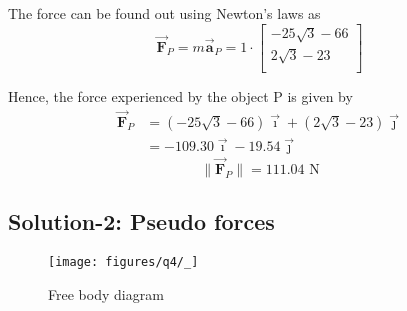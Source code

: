 The force can be found out using Newton's laws as
\begin{equation*}
    \vec{\mathbf{F}}_P
    =
    m \vec{\mathbf{a}}_P = 1 \cdot
    \begin{bmatrix}
        - 25\sqrt{3} - 66 \\
        2\sqrt{3} - 23    \\
    \end{bmatrix}
\end{equation*}

Hence, the force experienced by the object P is given by
\begin{align*}
    \vec{\mathbf{F}}_P
     & =
    \boxed{
        (- 25\sqrt{3} - 66) \vec{\mathbf{\imath}} + (2\sqrt{3} - 23) \vec{\mathbf{\jmath}}
    }
    \\ & =
    \boxed{
        -109.30 \vec{\mathbf{\imath}} -19.54 \vec{\mathbf{\jmath}}
    }
\end{align*}
\begin{equation*}
    \boxed{
        \lVert \vec{\mathbf{F}}_P \rVert = 111.04 \text{ N}
    }
\end{equation*}

\newpage
\subsection*{Solution-2: Pseudo forces}

\begin{figure*}[htb]
    \centering
    \texttt{[image: figures/q4/\_]}
    \caption{
        Free body diagram
    }
\end{figure*}
